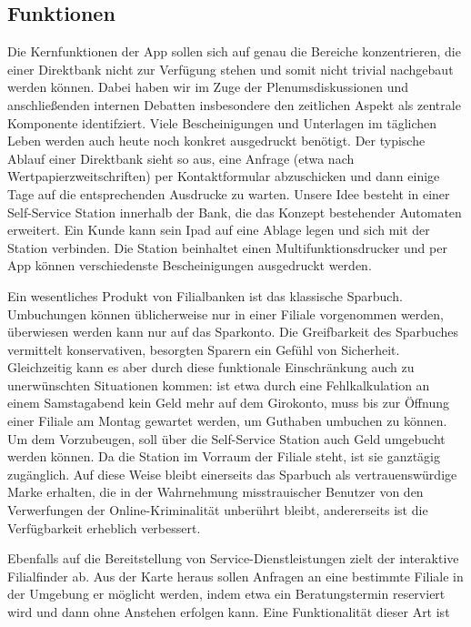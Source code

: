 \subsection{Funktionen}
    Die Kernfunktionen der App sollen sich auf genau die Bereiche konzentrieren, die einer Direktbank nicht zur Verfügung stehen und somit nicht trivial nachgebaut werden können. Dabei haben wir im Zuge der Plenumsdiskussionen und anschließenden internen Debatten insbesondere den zeitlichen Aspekt als zentrale Komponente identifziert. Viele Bescheinigungen und Unterlagen im täglichen Leben werden auch heute noch konkret ausgedruckt benötigt. Der typische Ablauf einer Direktbank sieht so aus, eine Anfrage (etwa nach Wertpapierzweitschriften) per Kontaktformular abzuschicken und dann einige Tage auf die entsprechenden Ausdrucke zu warten. Unsere Idee besteht in einer Self-Service Station innerhalb der Bank, die das Konzept bestehender Automaten erweitert. Ein Kunde kann sein Ipad auf eine Ablage legen und sich mit der Station verbinden. Die Station beinhaltet einen Multifunktionsdrucker und per App können verschiedenste Bescheinigungen ausgedruckt werden. 
    
    Ein wesentliches Produkt von Filialbanken ist das klassische Sparbuch. Umbuchungen können üblicherweise nur in einer Filiale vorgenommen werden, überwiesen werden kann nur auf das Sparkonto. Die Greifbarkeit des Sparbuches vermittelt konservativen, besorgten Sparern ein Gefühl von Sicherheit. Gleichzeitig kann es aber durch diese funktionale Einschränkung auch zu unerwünschten Situationen kommen: ist etwa durch eine Fehlkalkulation an einem Samstagabend kein Geld mehr auf dem Girokonto, muss bis zur Öffnung einer Filiale am Montag gewartet werden, um Guthaben umbuchen zu können. Um dem Vorzubeugen, soll über die Self-Service Station auch Geld umgebucht werden können. Da die Station im Vorraum der Filiale steht, ist sie ganztägig zugänglich. Auf diese Weise bleibt einerseits das Sparbuch als vertrauenswürdige Marke erhalten, die in der Wahrnehmung misstrauischer Benutzer von den Verwerfungen der Online-Kriminalität unberührt bleibt, andererseits ist die Verfügbarkeit erheblich verbessert.
    
    Ebenfalls auf die Bereitstellung von Service-Dienstleistungen zielt der interaktive Filialfinder ab. Aus der Karte heraus sollen Anfragen an eine bestimmte Filiale in der Umgebung er möglicht werden, indem etwa ein Beratungstermin reserviert wird und dann ohne Anstehen erfolgen kann. Eine Funktionalität dieser Art ist 
      
